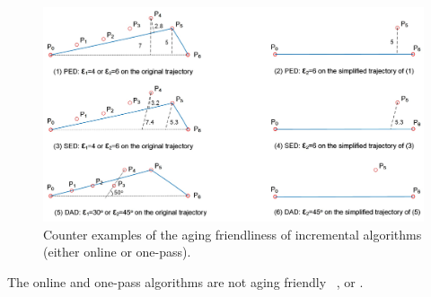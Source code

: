 	
\begin{figure}[tb!]
	\centering
	\includegraphics[scale=0.66]{Figures/Fig-aging-incre.jpg}
	\vspace{-1ex}
	\caption{\small Counter examples of the aging friendliness of incremental algorithms (either online or one-pass).}
	\vspace{-1ex}
	\label{fig:aging-incre}
\end{figure}

\begin{proposition}
	\label{theo-aging-online}
	The online and one-pass algorithms are not aging friendly \wrt~\ped, \sed or \dad.

\end{proposition}

